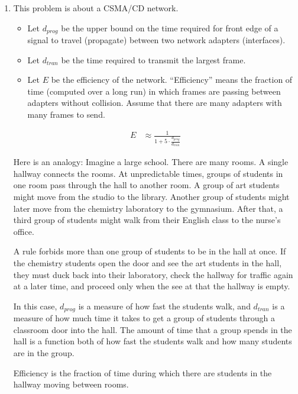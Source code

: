 \documentclass[twoside]{article}
\newenvironment{answer}
  {\vspace*{0.2cm} \rule{12cm}{0.04cm} \vspace*{0.2cm}}
  {\vspace*{0.2cm}}
\begin{document}
\begin{enumerate}
\begin{answer}
    \end{answer}

  \item This problem is about a CSMA/CD network.
  \begin{itemize}
    \item Let $d_{prog}$ be the upper bound on the time required
      for front edge of a signal to travel (propagate) between two network adapters (interfaces).
    \item Let $d_{tran}$ be the time required to transmit the largest frame.
    \item Let $E$ be the efficiency of the network. ``Efficiency'' means the
      fraction of time (computed over a long run) in which frames are passing
      between adapters without collision. Assume that there are many adapters
      with many frames to send.
    \end{itemize}

  \begin{align*}
    E & \approx \frac{1}{1 + 5 \cdot \frac{d_{prog}}{d_{tran}}}
    \end{align*}

    Here is an analogy: Imagine a large school. There are many rooms.
    A single hallway connects the rooms. At unpredictable times, groups of students in
    one room pass through the hall to another room. A group of art
    students might move from the studio to the library. Another group of
    students might later move from the chemistry laboratory to the gymnasium.
    After that, a third group of students might walk from their English class to
    the nurse's office.

    A rule forbids more than one group of students to be in the hall at once.
    If the chemistry students open the door and see the art students in the hall,
    they must duck back into their laboratory, check the hallway for traffic
    again at a later time, and proceed only when the see at that the hallway
    is empty.

    In this case, $d_{prog}$ is a measure of how fast the students walk,
    and $d_{tran}$ is a measure of how much time it takes to get a group
    of students through a classroom door into the hall.
    The amount of time that a group spends in the hall is a function
    both of how fast the students walk and how many students are in the
    group.

    Efficiency is the fraction of time during which there are students
    in the hallway moving between rooms.
    

\end{enumerate}
\end{document}
